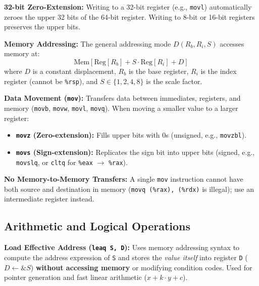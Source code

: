 \begin{important}
    \textbf{32-bit Zero-Extension:} Writing to a 32-bit register (e.g., \texttt{movl}) automatically zeroes the upper 32 bits of the 64-bit register. Writing to 8-bit or 16-bit registers preserves the upper bits.
\end{important}

\begin{definition}
    \textbf{Memory Addressing:} The general addressing mode $D(R_b, R_i, S)$ accesses memory at:
    \[
        \text{Mem}[\text{Reg}[R_b] + S \cdot \text{Reg}[R_i] + D]
    \]
    where $D$ is a constant displacement, $R_b$ is the base register, $R_i$ is the index register (cannot be \texttt{\%rsp}), and $S \in \{1, 2, 4, 8\}$ is the scale factor.
\end{definition}

\begin{definition}
    \textbf{Data Movement (\texttt{mov}):} Transfers data between immediates, registers, and memory (\texttt{movb}, \texttt{movw}, \texttt{movl}, \texttt{movq}). When moving a smaller value to a larger register:
    \begin{itemize}
        \item \textbf{\texttt{movz} (Zero-extension):} Fills upper bits with 0s (unsigned, e.g., \texttt{movzbl}).
        \item \textbf{\texttt{movs} (Sign-extension):} Replicates the sign bit into upper bits (signed, e.g., \texttt{movslq}, or \texttt{cltq} for \texttt{\%eax} $\to$ \texttt{\%rax}).
    \end{itemize}
\end{definition}

\begin{important}
    \textbf{No Memory-to-Memory Transfers:} A single \texttt{mov} instruction cannot have both source and destination in memory (\texttt{movq (\%rax), (\%rdx)} is illegal); use an intermediate register instead.
\end{important}

\subsection{Arithmetic and Logical Operations}

\begin{definition}
    \textbf{Load Effective Address (\texttt{leaq S, D}):} Uses memory addressing syntax to compute the address expression of \texttt{S} and stores the \emph{value itself} into register \texttt{D} ($D \leftarrow \&S$) \textbf{without accessing memory} or modifying condition codes. Used for pointer generation and fast linear arithmetic ($x + k \cdot y + c$).
\end{definition}

